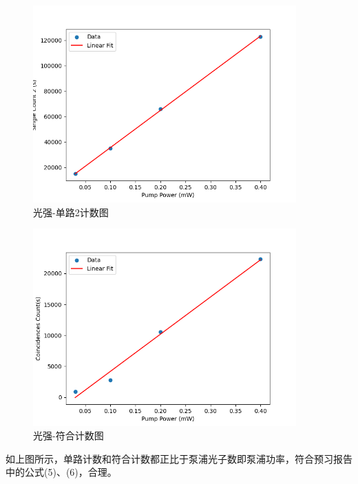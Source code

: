 \documentclass[a4paper,UTF8]{ctexart}
\begin{document}
\begin{figure}[H]
    \centering
    \begin{minipage}[b]{0.9\textwidth}
        \centering
        \includegraphics[width=0.9\textwidth]{./ffig2.png}
        \caption{光强-单路2计数图}
    \end{minipage}
\end{figure}

\begin{figure}[H]
    \centering
    \begin{minipage}[b]{0.9\textwidth}
        \centering
        \includegraphics[width=0.9\textwidth]{./ffig3.png}
        \caption{光强-符合计数图}
    \end{minipage}
\end{figure}

如上图所示，单路计数和符合计数都正比于泵浦光子数即泵浦功率，符合预习报告中的公式(5)、(6)，合理。
\end{document}
